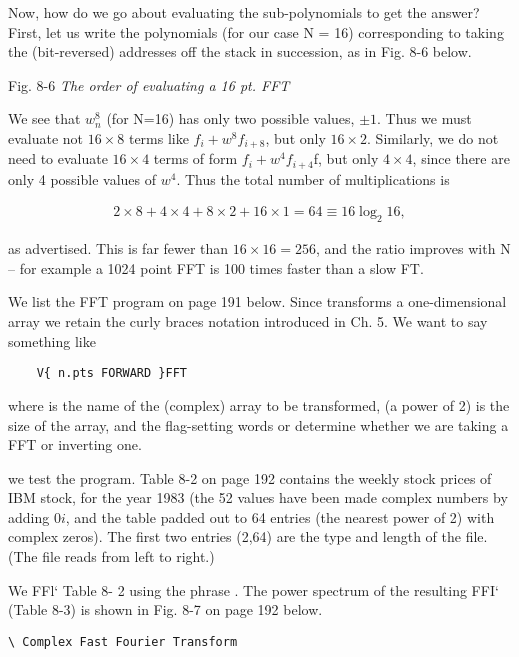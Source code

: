 Now, how do we go about evaluating the sub-polynomials to get the answer? First, let us write the polynomials (for our case N = 16) corresponding to taking the (bit-reversed) addresses off the stack in succession, as in Fig. 8-6 below.

Fig. 8-6 \textit{The order of evaluating a 16 pt. FFT}

We see that $w_{n}^{8}$ (for N=16) has only two possible values, $\pm1$. Thus we must evaluate not $16\times8$ terms like $f_{i} + w^{8}f_{i+8}$, but only $16\times2$. Similarly, we do not need to evaluate $16\times4$ terms of form $f_{i} + w^{4}f_{i+4}$f, but only $4\times4$, since there are only 4 possible values of $w^{4}$. Thus the total number of multiplications is

\begin{align*}
    2\times8 + 4\times4 + 8\times2 + 16\times1 = 64 \equiv 16\log_{2}16,
\end{align*}

as advertised. This is far fewer than $16\times16=256$, and the ratio improves with N -- for example a 1024 point FFT is 100 times faster than a slow FT.

We list the FFT program on page 191 below. Since  transforms a one-dimensional array we retain the curly braces notation introduced in Ch. 5. We want to say something like

\begin{lstlisting}
    V{ n.pts FORWARD }FFT
\end{lstlisting}

where  is the name of the (complex) array to be transformed,  (a power of 2) is the size of the array, and the flag-setting words  or  determine whether we are taking a FFT or inverting one.

 we test the program. Table 8-2 on page 192 contains the weekly stock prices of IBM stock, for the year 1983 (the 52 values have been made complex numbers by adding $0i$, and the table padded out to 64 entries (the nearest power of 2) with complex zeros). The first two entries (2,64) are the type and length of the file. (The file reads from left to right.)

We FFl‘ Table 8- 2 using the phrase . The power spectrum of the resulting FFI‘ (Table 8-3) is shown in Fig. 8-7 on page 192 below.

\begin{lstlisting}
\ Complex Fast Fourier Transform

\end{lstlisting}

